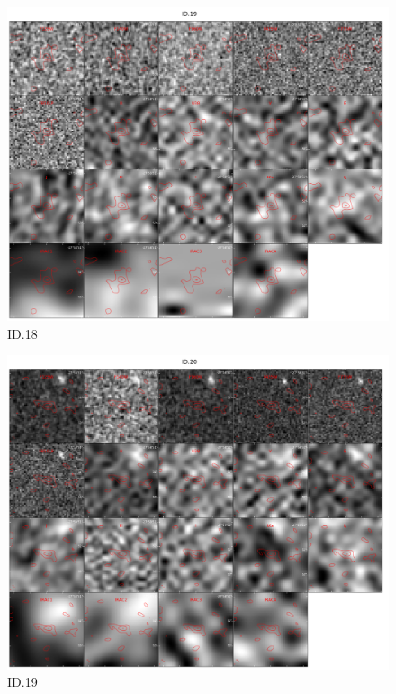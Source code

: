 \begin{figure}[tbp]
\centering \includegraphics[width=120mm]{Matched/ASPECS_Cutout_18.jpg}
\caption{ID.18}
\label{fig:Match_Three}
\end{figure}

\begin{figure}[tbp]
\centering \includegraphics[width=120mm]{Matched/ASPECS_Cutout_19.jpg}
\caption{ID.19}
\label{fig:Match_Three}
\end{figure}

